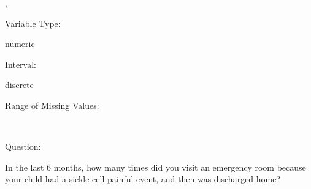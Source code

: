 \documentclass[
]{article}
\begin{document}
,

\begin{minipage}[t]{0.3\linewidth}

\colorbox{mypink1}{}

\end{minipage}%
\begin{minipage}[t]{0.7\linewidth}

\colorbox{mypink1}{\makebox[\textwidth]{\strut\bfseries\color{black}  
 }}

\end{minipage}

\begin{minipage}[t]{0.3\linewidth}

Variable Type:

\end{minipage}%
\begin{minipage}[t]{0.7\linewidth}

numeric

\end{minipage}

\begin{minipage}[t]{0.3\linewidth}

Interval:

\end{minipage}%
\begin{minipage}[t]{0.7\linewidth}

discrete

\end{minipage}

\begin{minipage}[t]{0.3\linewidth}

Range of Missing Values:

\end{minipage}%
\begin{minipage}[t]{0.7\linewidth}

~

\end{minipage}

\begin{minipage}[t]{0.3\linewidth}

Question:

\end{minipage}%
\begin{minipage}[t]{0.7\linewidth}

In the last 6 months, how many times did you visit an emergency room
because your child had a sickle cell painful event, and then was
discharged home?

\end{minipage}
\end{document}
